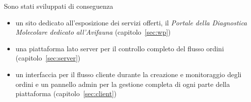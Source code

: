 Sono stati sviluppati di conseguenza
\begin{itemize}
\item un sito dedicato all'esposizione dei servizi offerti, il \emph{Portale della Diagnostica Molecolare dedicato all'Avifauna} (capitolo~\ref{sec:wp})
\item una piattaforma lato server per il controllo completo del flusso ordini (capitolo~\ref{sec:server})
\item un interfaccia per il flusso cliente durante la creazione e monitoraggio degli ordini e un pannello admin per la gestione completa di ogni parte della piattaforma (capitolo~\ref{sec:client})
\end{itemize}
